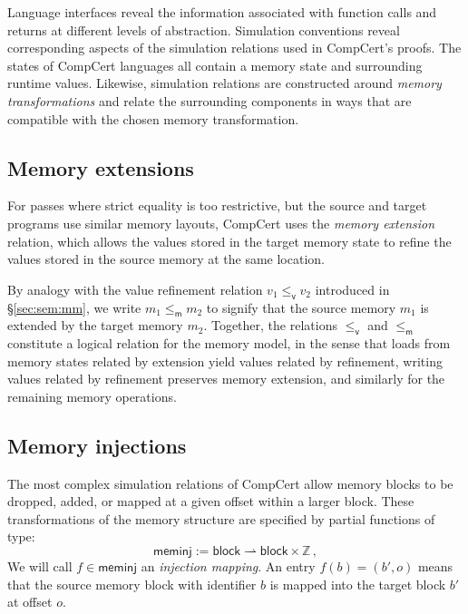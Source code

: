 \documentclass[acmsmall,authordraft]{acmart}
\newcommand{\kw}[1]{\ensuremath{ \mathsf{#1} }}
\newcommand{\vref}{\le_\kw{v}}
\newcommand{\mext}{\le_\kw{m}}
\begin{document}
Language interfaces reveal the information
associated with function calls and returns
at different levels of abstraction.
Simulation conventions
reveal corresponding aspects of the simulation relations
used in CompCert's proofs.
%
The states of CompCert languages all contain
a memory state and surrounding runtime values.
Likewise, simulation relations
are constructed around \emph{memory transformations}
and relate the surrounding components in ways that %
are compatible with the chosen memory transformation.

\subsection{Memory extensions} \label{sec:memext} %

For passes where strict equality is too restrictive,
but the source and target programs
use similar memory layouts,
CompCert uses the \emph{memory extension} relation,
which allows the values
stored in the target memory state to refine
the values stored in the source memory at the same location.

By analogy with
the value refinement relation $v_1 \vref v_2$
introduced in \S\ref{sec:sem:mm},
we write $m_1 \mext m_2$ to signify that
the source memory $m_1$ is extended by
the target memory $m_2$.
Together,
the relations $\vref$ and $\mext$
constitute a logical relation for the memory model,
in the sense that
loads from memory states related by extension
yield values related by refinement,
writing values related by refinement
preserves memory extension,
and similarly for the remaining memory operations.


\subsection{Memory injections} \label{sec:meminj} %

The most complex simulation relations of CompCert
allow memory blocks to be dropped, added, or
mapped at a given offset within a larger block.
These transformations of the memory structure
are specified by partial functions of type:
\[
  \kw{meminj} := \kw{block} \rightharpoonup \kw{block} \times \mathbb{Z} \,,
\]
We will call $f \in \kw{meminj}$
an \emph{injection mapping}.
An entry $f(b) = (b', o)$
means that the source memory block with identifier $b$
is mapped into the target block $b'$
at offset $o$.
\end{document}
